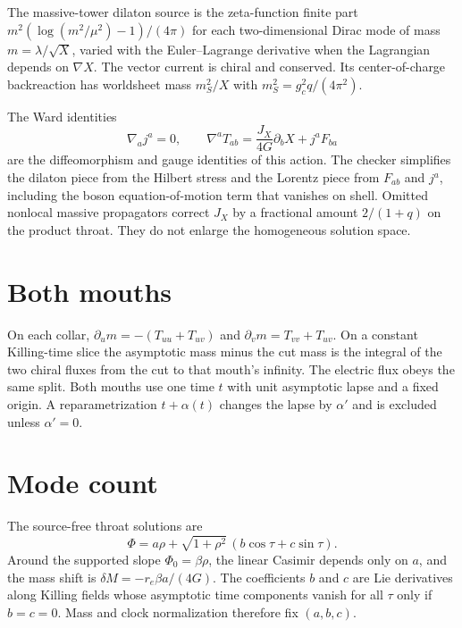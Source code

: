 \documentclass[11pt]{article}
\begin{document}
The massive-tower dilaton source is the zeta-function finite part
\(m^{2}(\log(m^{2}/\mu^{2})-1)/(4\pi)\) for each two-dimensional Dirac mode of mass \(m=\lambda/\sqrt{X}\), varied with the Euler--Lagrange derivative when the Lagrangian depends on \(\nabla X\). The vector current is chiral and conserved. Its center-of-charge backreaction has worldsheet mass \(m_{S}^{2}/X\) with \(m_{S}^{2}=g_{c}^{2} q/(4\pi^{2})\).

The Ward identities
\begin{equation}
\nabla_{a} j^{a}=0,
\qquad
\nabla^{a} T_{ab}=\frac{J_{X}}{4G}\partial_{b} X+j^{a} F_{ba}
\end{equation}
are the diffeomorphism and gauge identities of this action. The checker simplifies the dilaton piece from the Hilbert stress and the Lorentz piece from \(F_{ab}\) and \(j^{a}\), including the boson equation-of-motion term that vanishes on shell. Omitted nonlocal massive propagators correct \(J_{X}\) by a fractional amount \(2/(1+q)\) on the product throat. They do not enlarge the homogeneous solution space.

\section{Both mouths}
On each collar,
\(\partial_{u} m=-(T_{uu}+T_{uv})\) and \(\partial_{v} m=T_{vv}+T_{uv}\).
On a constant Killing-time slice the asymptotic mass minus the cut mass is the integral of the two chiral fluxes from the cut to that mouth's infinity. The electric flux obeys the same split. Both mouths use one time \(t\) with unit asymptotic lapse and a fixed origin. A reparametrization \(t+\alpha(t)\) changes the lapse by \(\alpha'\) and is excluded unless \(\alpha'=0\).

\section{Mode count}
The source-free throat solutions are
\begin{equation}
\Phi=a\rho+\sqrt{1+\rho^{2}}\,(b\cos\tau+c\sin\tau).
\end{equation}
Around the supported slope \(\Phi_{0}=\beta\rho\), the linear Casimir depends only on \(a\), and the mass shift is \(\delta M=-r_{e}\beta a/(4G)\). The coefficients \(b\) and \(c\) are Lie derivatives along Killing fields whose asymptotic time components vanish for all \(\tau\) only if \(b=c=0\). Mass and clock normalization therefore fix \((a,b,c)\).
\end{document}
